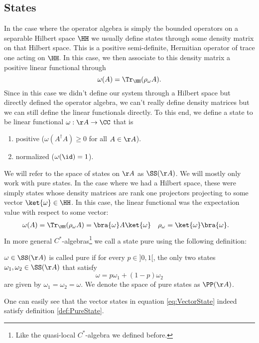 \subsection{States}
In the case where the operator algebra is simply the bounded operators on a separable Hilbert space $\HH$ we usually define states through some density matrix on that Hilbert space. This is a positive semi-definite, Hermitian operator of trace one acting on $\HH$. In this case, we then associate to this density matrix a positive linear functional through
\begin{equation}
\omega(A)= \Tr_\HH(\rho_\omega A).
\end{equation}
Since in this case we didn't define our system through a Hilbert space but directly defined the operator algebra, we can't really define density matrices but we can still define the linear functionals directly. To this end, we define a state to be linear functional $\omega:\AA\rightarrow \CC$ that is
\begin{enumerate}
	\item positive ($\omega(A^\dagger A)\geq 0$ for all $A\in\AA$).
	\item normalized ($\omega(\id)=1$).
\end{enumerate}
We will refer to the space of states on $\AA$ as $\SS(\AA)$. We will mostly only work with pure states. In the case where we had a Hilbert space, these were simply states whose density matrices are rank one projectors projecting to some vector $\ket{\omega}\in\HH$. In this case, the linear functional was the expectation value with respect to some vector:
\begin{align}\label{eq:VectorState}
\omega(A)&=\Tr_\HH(\rho_\omega A)=\bra{\omega}A\ket{\omega}&\rho_\omega&=\ket{\omega}\bra{\omega}.
\end{align}
In more general $C^*$-algebras\footnote{Like the quasi-local $C^*$-algebra we defined before.} we call a state pure using the following definition:
\begin{definition}[pure]\label{def:PureState}
	$\omega\in\SS(\AA)$ is called pure if for every $p\in]0,1[$, the only two states $\omega_1,\omega_2\in\SS(\AA)$ that satisfy
	\begin{equation}
	\omega=p\omega_1+(1-p)\omega_2
	\end{equation}
	are given by $\omega_1=\omega_2=\omega$. We denote the space of pure states as $\PP(\AA)$.
\end{definition}
One can easily see that the vector states in equation \eqref{eq:VectorState} indeed satisfy definition \ref{def:PureState}.
